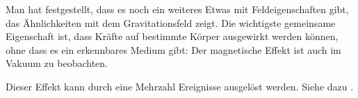 




%
%	






Man hat festgestellt, dass es noch ein weiteres Etwas mit Feldeigenschaften gibt, das Ähnlichkeiten mit dem Gravitationsfeld zeigt. Die wichtigste gemeinsame Eigenschaft ist, dass Kräfte auf bestimmte Körper ausgewirkt werden können, ohne dass es ein erkennbares Medium gibt: Der magnetische Effekt ist auch im Vakuum zu beobachten. 

Dieser Effekt kann durch eine Mehrzahl Ereignisse ausgelöst werden. Siehe dazu .




